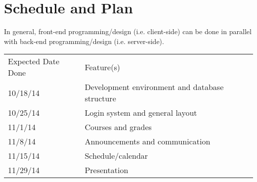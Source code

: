 \documentclass{article}
\begin{document}
\section{Schedule and Plan}

In general, front-end programming/design (i.e. client-side) can be done in
parallel with back-end programming/design (i.e. server-side).

\vspace{10 pt}

\begin{tabular}{ll}
    Expected Date Done&Feature(s)\\
    10/18/14&Development environment and database structure\\
    10/25/14&Login system and general layout\\
    11/1/14&Courses and grades\\
    11/8/14&Announcements and communication\\
    11/15/14&Schedule/calendar\\
    11/29/14&Presentation\\
\end{tabular}


\nocite{*}

{}

\end{document}
